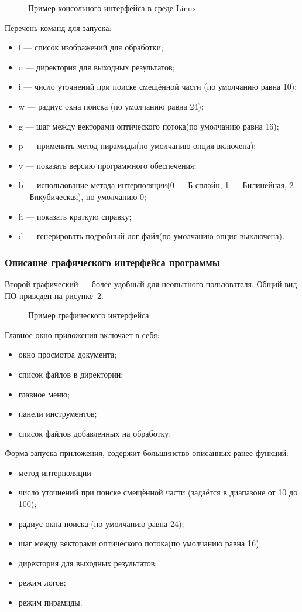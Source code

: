 \begin{figure}[ht]
\caption{Пример консольного интерфейса в среде Linux}
\label{pic:con_scr}
\end{figure}

Перечень команд для запуска:
\begin{itemize}
\item l — список изображений для обработки;
\item o — директория для выходных результатов;
\item i — число уточнений при поиске смещённой части (по умолчанию равна 10);
\item w — радиус окна поиска (по умолчанию равна 24);
\item g — шаг между векторами оптического потока(по умолчанию равна 16);
\item p — применить метод пирамиды(по умолчанию опция включена);
\item v — показать версию программного обеспечения;
\item b — использование метода интерполяции(0 — Б-сплайн, 1 — Билинейная, 2 — Бикубическая), по умолчанию 0;
\item h — показать краткую справку;
\item d — генерировать подробный лог файл(по умолчанию опция выключена).
\end{itemize}
\subsubsection{Описание графического интерфейса программы}
Второй графический — более удобный для неопытного пользователя. Общий вид ПО приведен на рисунке \ref{pic:gui_scr}. 
\begin{figure}[ht]
\caption{Пример графического интерфейса}
\label{pic:gui_scr}
\end{figure}
Главное окно приложения включает в себя:
\begin{itemize}
\item окно просмотра документа;
\item список файлов в директории;
\item главное меню;
\item панели инструментов;
\item список файлов добавленных на обработку.
\end{itemize}
Форма запуска приложения, содержит большинство описанных ранее функций:
\begin{itemize}
\item метод интерполяции
\item число уточнений при поиске смещённой части (задаётся в диапазоне от 10 до 100);
\item радиус окна поиска (по умолчанию равна 24);
\item шаг между векторами оптического потока(по умолчанию равна 16);
\item директория для выходных результатов;
\item режим логов;
\item режим пирамиды.
\end{itemize}